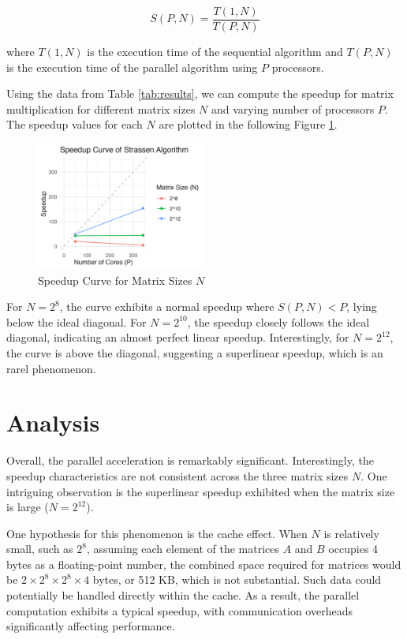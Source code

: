 \documentclass[12pt,a4paper]{article}
\begin{document}
\begin{equation}
    S(P, N) = \frac{T(1,N)}{T(P, N)}
\end{equation}

where \( T(1,N) \) is the execution time of the sequential algorithm and 
 \( T(P, N) \) is the execution time of the parallel algorithm using \( P \) processors.

 Using the data from Table \ref{tab:results}, 
  we can compute the speedup for matrix multiplication for different 
  matrix sizes \( N \) and varying number of processors \( P \). 
The speedup values for each \( N \) are plotted in the following Figure \ref{fig:speedup_curve}.

\begin{figure}
    \centering
    \includegraphics[width=0.5\textwidth]{speedup_curve.png}
    \caption{Speedup Curve for Matrix Sizes \( N \)}
    \label{fig:speedup_curve}
\end{figure}
    
For \( N = 2^8 \), the curve exhibits a normal speedup where \( S(P, N) < P \), 
 lying below the ideal diagonal. 
For \( N = 2^{10} \), the speedup closely follows the ideal diagonal, 
 indicating an almost perfect linear speedup. 
Interestingly, for \( N = 2^{12} \), the curve is above the diagonal, 
 suggesting a superlinear speedup, which is an rarel phenomenon.

\section{Analysis}

Overall, the parallel acceleration is remarkably significant. 
Interestingly, the speedup characteristics are not consistent across the 
 three matrix sizes \( N \). 
One intriguing observation is the superlinear speedup exhibited when 
 the matrix size is large (\( N = 2^{12} \)).
 
One hypothesis for this phenomenon is the cache effect. 
When \( N \) is relatively small, such as \( 2^8 \), 
 assuming each element of the matrices \( A \) and \( B \) occupies 4 bytes 
 as a floating-point number, 
 the combined space required for matrices would be 
 \( 2 \times 2^8 \times 2^8 \times 4 \) bytes, or 512 KB,
 which is not substantial. 
Such data could potentially be handled directly within the cache. 
As a result, the parallel computation exhibits a typical speedup, 
 with communication overheads significantly affecting performance.
 
\end{document}
